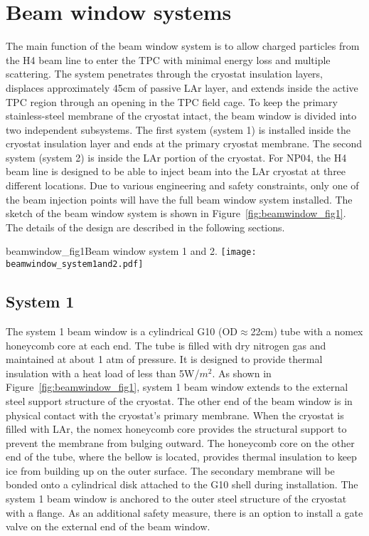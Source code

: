 \section{Beam window systems}
\label{sec:beamwindow}
The main function of the beam window system is to allow charged particles from the H4 beam line to enter the TPC with minimal energy loss and multiple scattering. The system penetrates through the cryostat insulation layers, displaces approximately 45cm of passive LAr layer, and extends inside the active TPC region through an opening in the TPC field cage. To keep the primary stainless-steel membrane of the cryostat intact, the beam window is divided into two independent subsystems. The first system (system 1) is installed inside the cryostat insulation layer and ends at the primary cryostat membrane. The second system (system 2) is inside the LAr portion of the cryostat. For NP04, the H4 beam line is designed to be able to inject beam into the LAr cryostat at three different locations. Due to various engineering and safety constraints, only one of the beam injection points will have the full beam window system installed. The sketch of the beam window system is shown in Figure~\ref{fig:beamwindow_fig1}. The details of the design are described in the following sections.
\begin{cdrfigure}{beamwindow_fig1}{Beam window system 1 and 2.}
  \texttt{[image: beamwindow\_system1and2.pdf]}
\end{cdrfigure}

\subsection{System 1}
The system 1 beam window is a cylindrical G10 (OD$\approx$22cm) tube with a nomex honeycomb core at each end. The tube is filled with dry nitrogen gas and maintained at about 1 atm of pressure. It is designed to provide thermal insulation with a heat load of less than 5W/$m^2$. As shown in Figure~\ref{fig:beamwindow_fig1}, system 1 beam window extends to the external steel support structure of the cryostat. The other end of the beam window is in physical contact with the cryostat's primary membrane. When the cryostat is filled with LAr, the nomex honeycomb core provides the structural support to prevent the membrane from bulging outward. The honeycomb core on the other end of the tube, where the bellow is located, provides thermal insulation to keep ice from building up on the outer surface. The secondary membrane will be bonded onto a cylindrical disk attached to the G10 shell during installation. The system 1 beam window is anchored to the outer steel structure of the cryostat with a flange. As an additional safety measure, there is an option to install a gate valve on the external end of the beam window.

